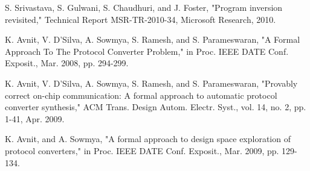 \documentclass[journal]{IEEEtran}
\begin{document}
{\begin{thebibliography}{1}
S. Srivastava,
S. Gulwani,
S. Chaudhuri, and
J. Foster,
"Program inversion revisited,"
Technical Report MSR-TR-2010-34, Microsoft Research, 2010.


K. Avnit, V. D'Silva, A. Sowmya, S. Ramesh, and S. Parameswaran,
"A Formal Approach To The Protocol Converter Problem,"
in Proc. IEEE DATE Conf. Exposit., Mar. 2008, pp. 294-299.



K. Avnit, V. D'Silva, A. Sowmya, S. Ramesh, and S. Parameswaran,
"Provably correct on-chip communication: A formal approach to automatic protocol converter synthesis,"
ACM Trans. Design Autom. Electr. Syst.,
vol. 14, no. 2, pp. 1-41, Apr. 2009.



K. Avnit, and A. Sowmya,
"A formal approach to design space exploration of protocol converters,"
in Proc. IEEE DATE Conf. Exposit., Mar. 2009, pp. 129-134.





%





\end{thebibliography}

%



}
\end{document}

